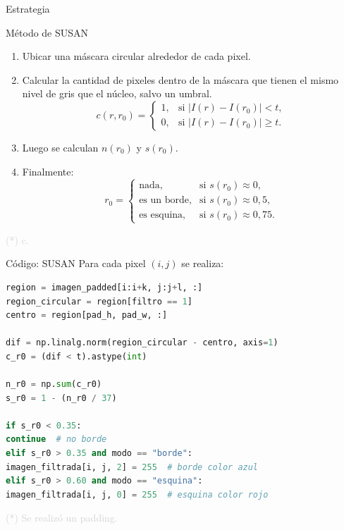 \documentclass{beamer}
\begin{document}
\begin{frame}[fragile]{Estrategia}
	\justifying
	\begin{block}{Método de SUSAN}
		\begin{enumerate}
			\item Ubicar una máscara circular alrededor de cada pixel.
			\item Calcular la cantidad de pixeles dentro de la máscara que tienen el mismo nivel de gris que el núcleo, salvo un umbral.
			\[
			c(r, r_0) =
			\begin{cases}
				1, & \text{si } |I(r) - I(r_0)| < t,\\
				0, & \text{si } |I(r) - I(r_0)| \geq t.
			\end{cases}
			\]
			\item Luego se calculan $n(r_0)$ y $s(r_0)$.
			\item Finalmente:
			\[
			r_0 =
			\begin{cases}
				\text{nada}, & \text{si } s(r_0) \approx 0,\\
				\text{es un borde}, & \text{si } s(r_0) \approx 0,5,\\
				\text{es esquina}, & \text{si } s(r_0) \approx 0,75.
			\end{cases}
			\]
		\end{enumerate}
	\end{block}
	
	\vfill
	\footnotesize \textcolor{lightgray}{(*) c.}
\end{frame}

\begin{frame}[fragile]{Código: SUSAN}
	\justifying
	Para cada pixel $(i, j)$ se realiza:
	
	\begin{lstlisting}[language=Python]
region = imagen_padded[i:i+k, j:j+l, :]
region_circular = region[filtro == 1]
centro = region[pad_h, pad_w, :]

dif = np.linalg.norm(region_circular - centro, axis=1)
c_r0 = (dif < t).astype(int)

n_r0 = np.sum(c_r0)
s_r0 = 1 - (n_r0 / 37)

if s_r0 < 0.35:
continue  # no borde
elif s_r0 > 0.35 and modo == "borde":
imagen_filtrada[i, j, 2] = 255  # borde color azul
elif s_r0 > 0.60 and modo == "esquina":
imagen_filtrada[i, j, 0] = 255  # esquina color rojo
	\end{lstlisting}
	
	\vfill
	\footnotesize \textcolor{lightgray}{(*) Se realizó un padding.}
\end{frame}
\end{document}
